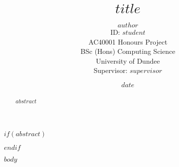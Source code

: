 \documentclass[twocolumn]{article}
\title{$title$}
\author{$author$\\ID: $student$\\AC40001 Honours Project\\BSc (Hons) Computing Science\\University of Dundee\\Supervisor: $supervisor$}
\date{$date$\vspace{5ex}}
\begin{document}
\maketitle



$if(abstract)$
\begin{abstract}
$abstract$
\end{abstract}
$endif$


$body$


\end{document}

